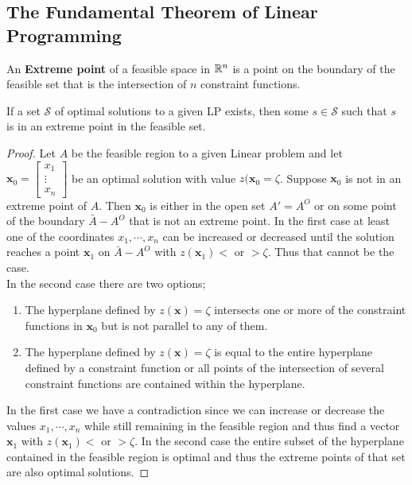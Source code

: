 \subsection{The Fundamental Theorem of Linear Programming}
\begin{definition}
An \textbf{Extreme point} of a feasible space in $\mathbb{R}^n$ is a point on the boundary of the feasible set that is the intersection of $n$ constraint functions.
\end{definition}
\begin{theorem}\label{extreme point}
If a set $\mathcal{S}$ of optimal solutions to a given LP exists, then some $s\in \mathcal{S}$ such that $s$ is in an extreme point in the feasible set.
\begin{proof}
Let $A$ be the feasible region to a given Linear problem and let $\textbf{x}_0=\begin{bmatrix}
x_1\\ \vdots\\ x_n
\end{bmatrix}
$ be an optimal solution with value $z(\textbf{x}_0=\zeta$.
Suppose $\textbf{x}_0$ is not in an extreme point of $A$. Then $\textbf{x}_0$ is either in the open set $A'=A^O$ or on some point of the boundary $\bar{A}-A^O$ that is not an extreme point. In the first case at least one of the coordinates $x_1,\cdots, x_n$ can be increased or decreased until the solution reaches a point $\textbf{x}_1$ on $\bar{A}-A^O$ with $z(\textbf{x}_1)< \text{ or } > \zeta$. Thus that cannot be the case.\\
In the second case there are two options;
\begin{enumerate}
\item The hyperplane defined by $z(\textbf{x}) = \zeta$ intersects one or more of the constraint functions in $\textbf{x}_0$ but is not parallel to any of them.
\item The hyperplane defined by $z(\textbf{x}) = \zeta$ is equal to the entire hyperplane defined by a constraint function or all points of the intersection of several constraint functions are contained within the hyperplane.
\end{enumerate}
In the first case we have a contradiction since we can increase or decrease the values $x_1,\cdots, x_n$ while still remaining in the feasible region and thus find a vector $\textbf{x}_1$ with $z(\textbf{x}_1)< \text{ or } > \zeta$. In the second case the entire subset of the hyperplane contained in the feasible region is optimal and thus the extreme points of that set are also optimal solutions.
\end{proof}
\end{theorem}
